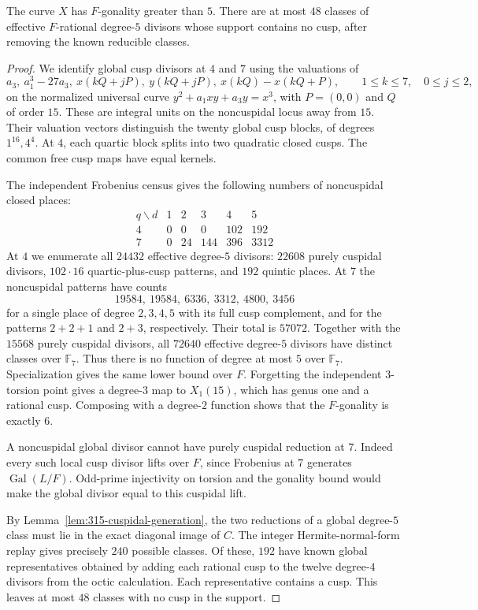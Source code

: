 \begin{lemma}\label{lem:315-degree5-classes}
The curve $X$ has $F$-gonality greater than $5$.
There are at most $48$ classes of effective $F$-rational degree-$5$
divisors whose support contains no cusp, after removing the known
reducible classes.
\end{lemma}
\begin{proof}
We identify global cusp divisors at $4$ and $7$ using the valuations of
\[
 a_3,\ a_1^3-27a_3,\ x(kQ+jP),\ y(kQ+jP),\ x(kQ)-x(kQ+P),
 \qquad1\leq k\leq7,\quad0\leq j\leq2,
\]
on the normalized universal curve
$y^2+a_1xy+a_3y=x^3$, with $P=(0,0)$ and $Q$ of order $15$.
These are integral units on the noncuspidal locus away from $15$.
Their valuation vectors distinguish the twenty global cusp blocks,
of degrees $1^{16},4^4$. At $4$, each quartic block splits into two
quadratic closed cusps. The common free cusp maps have equal kernels.

The independent Frobenius census gives the following numbers of
noncuspidal closed places:
\[
\begin{array}{c|rrrrr}
q\backslash d&1&2&3&4&5\\\hline
4&0&0&0&102&192\\
7&0&24&144&396&3312
\end{array}
\]
At $4$ we enumerate all $24432$ effective degree-$5$ divisors:
$22608$ purely cuspidal divisors, $102\cdot16$ quartic-plus-cusp
patterns, and $192$ quintic places.
At $7$ the noncuspidal patterns have counts
\[
 19584,\ 19584,\ 6336,\ 3312,\ 4800,\ 3456
\]
for a single place of degree $2,3,4,5$ with its full cusp complement,
and for the patterns $2+2+1$ and $2+3$, respectively.
Their total is $57072$. Together with the $15568$ purely cuspidal
divisors, all $72640$ effective degree-$5$ divisors have distinct
classes over $\mathbb F_7$.
Thus there is no function of degree at most $5$ over $\mathbb F_7$.
Specialization gives the same lower bound over $F$.
Forgetting the independent $3$-torsion point gives a degree-$3$ map
to $X_1(15)$, which has genus one and a rational cusp.
Composing with a degree-$2$ function shows that the $F$-gonality is exactly $6$.

A noncuspidal global divisor cannot have purely cuspidal reduction
at $7$. Indeed every such local cusp divisor lifts over $F$, since
Frobenius at $7$ generates $\operatorname{Gal}(L/F)$.
Odd-prime injectivity on torsion and the gonality bound would make
the global divisor equal to this cuspidal lift.

By Lemma~\ref{lem:315-cuspidal-generation}, the two reductions of a
global degree-$5$ class must lie in the exact diagonal image of $C$.
The integer Hermite-normal-form replay gives precisely $240$ possible
classes. Of these, $192$ have known global representatives obtained
by adding each rational cusp to the twelve degree-$4$ divisors from
the octic calculation. Each representative contains a cusp.
This leaves at most $48$ classes with no cusp in the support.
\end{proof}

